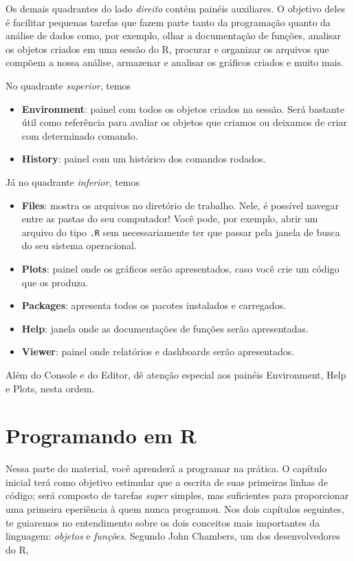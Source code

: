 \documentclass[
  letterpaper,
  DIV=11,
  numbers=noendperiod]{scrreprt}
\begin{document}
Os demais quadrantes do lado \emph{direito} contém painéis auxiliares. O
objetivo deles é facilitar pequenas tarefas que fazem parte tanto da
programação quanto da análise de dados como, por exemplo, olhar a
documentação de funções, analisar os objetos criados em uma sessão do R,
procurar e organizar os arquivos que compõem a nossa análise, armazenar
e analisar os gráficos criados e muito mais.

No quadrante \emph{superior}, temos

\begin{itemize}
\item
  \textbf{Environment}: painel com todos os objetos criados na sessão.
  Será bastante útil como referência para avaliar os objetos que criamos
  ou deixamos de criar com determinado comando.
\item
  \textbf{History}: painel com um histórico dos comandos rodados.
\end{itemize}

Já no quadrante \emph{inferior}, temos

\begin{itemize}
\item
  \textbf{Files}: mostra os arquivos no diretório de trabalho. Nele, é
  possível navegar entre as pastas do seu computador! Você pode, por
  exemplo, abrir um arquivo do tipo \texttt{.R} sem necessariamente ter
  que passar pela janela de busca do seu sistema operacional.
\item
  \textbf{Plots}: painel onde os gráficos serão apresentados, caso você
  crie um código que os produza.
\item
  \textbf{Packages}: apresenta todos os pacotes instalados e carregados.
\item
  \textbf{Help}: janela onde as documentações de funções serão
  apresentadas.
\item
  \textbf{Viewer}: painel onde relatórios e dashboards serão
  apresentados.
\end{itemize}

Além do Console e do Editor, dê atenção especial aos painéis
Environment, Help e Plots, nesta ordem.

\part{Programando em R}

Nessa parte do material, você aprenderá a programar na prática. O
capítulo inicial terá como objetivo estimular que a escrita de suas
primeiras linhas de código; será composto de tarefas \emph{super}
simples, mas suficientes para proporcionar uma primeira eperiência à
quem nunca programou. Nos dois capítulos seguintes, te guiaremos no
entendimento sobre os dois conceitos mais importantes da linguagem:
\emph{objetos} e \emph{funções}. Segundo John Chambers, um dos
desenvolvedores do R,
\end{document}
